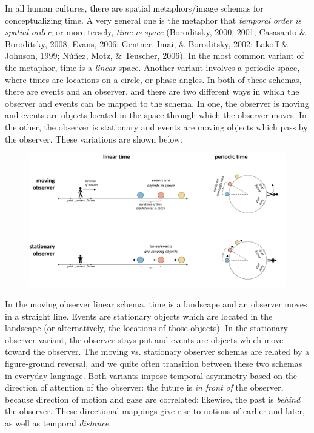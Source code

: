 In all human cultures, there are spatial metaphors/image schemas for conceptualizing time. A very general one is the metaphor that \textit{temporal} \textit{order} \textit{is} \textit{spatial} \textit{order}, or more tersely, \textit{time} \textit{is} \textit{space} (Boroditsky, 2000, 2001; Casasanto \& Boroditsky, 2008; Evans, 2006; Gentner, Imai, \& Boroditsky, 2002; Lakoff \& Johnson, 1999; Núñez, Motz, \& Teuscher, 2006). In the most common variant of the metaphor, time is a \textit{linear} space. Another variant involves a periodic space, where times are locations on a circle, or phase angles. In both of these schemas, there are events and an observer, and there are two different ways in which the observer and events can be mapped to the schema. In one, the observer is moving and events are objects located in the space through which the observer moves. In the other, the observer is stationary and events are moving objects which pass by the observer. These variations are shown below:

  
\begin{figure}
\includegraphics[width=\textwidth]{figures/Tilsen-img38.png}
\caption{\missingcaption}
\label{fig:}
\end{figure}
 

  In the moving observer linear schema, time is a landscape and an observer moves in a straight line. Events are stationary objects which are located in the landscape (or alternatively, the locations of those objects). In the stationary observer variant, the observer stays put and events are objects which move toward the observer. The moving vs. stationary observer schemas are related by a figure-ground reversal, and we quite often transition between these two schemas in everyday language. Both variants impose temporal asymmetry based on the direction of attention of the observer: the future is \textit{in} \textit{front} \textit{of} the observer, because direction of motion and gaze are correlated; likewise, the past is \textit{behind} the observer. These directional mappings give rise to notions of earlier and later, as well as temporal \textit{distance}. 

